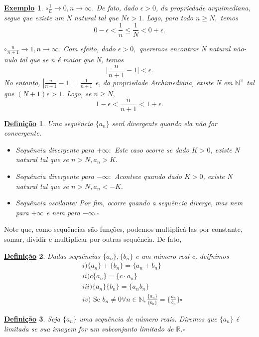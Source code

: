 \documentclass{article}
\newtheorem*{def*}{\underline{Defini\c c\~ao}}
\newtheorem{example}{\underline{Exemplo}}
\begin{document}
\begin{example}
  $\circ{}\frac{1}{n}\rightarrow0, n\rightarrow\infty$. De fato, dado $\epsilon > 0$, da propriedade arquimediana, segue que 
existe um N natural tal que $N\epsilon > 1.$ Logo, para todo $n\geq{N},$ temos 
  $$
  0 - \epsilon < \frac{1}{n}\leq{\frac{1}{N}} < 0 + \epsilon.
  $$

  $\circ \frac{n}{n+1}\rightarrow 1, n\rightarrow\infty$. Com efeito, dado $\epsilon > 0,$ queremos encontrar N natural n\~ao-nulo tal que
se n \'e maior que N, temos 
  $$
    \biggl|\frac{n}{n+1} - 1\biggr| < \epsilon.
  $$
  No entanto, $|\frac{n}{n+1}-1| = \frac{1}{n+1}$ e, da propriedade Archimediana, existe N em $\mathbb{N}^{\times}$ tal que
  $(N+1)\epsilon > 1$. Logo, se $n\geq{N},$
  $$
    1 - \epsilon < \frac{n}{n+1} < 1 + \epsilon.
  $$
\end{example}
\begin{def*}
  Uma sequ\^encia $\{a_{n}\}$ ser\'a divergente quando ela n\~ao for convergente.
 \begin{itemize}
    \item[I)] Sequ\^encia divergente para $+\infty:$ Este caso ocorre se dado $K > 0$, existe N natural tal que se $n > N,
a_{n} > K.$
    \item[II)] Sequ\^encia divergente para $-\infty:$ Acontece quando dado $K > 0$, existe N natural tal que se $n > N, 
a_{n} < -K.$
    \item[III)]Sequ\^encia oscilante: Por fim, ocorre quando a sequ\^encia diverge, mas nem para $+\infty$ e nem para $-\infty.\square$
 \end{itemize}
\end{def*}
  Note que, como sequ\^encias s\~ao fun\c c\~oes, podemos multiplic\'a-las por constante, somar, dividir e multiplicar por outras sequ\^encia. De fato,
 \begin{def*}
   Dadas sequ\^encias $\{a_{n}\}, \{b_{n}\}$ e um n\'umero real c, deifnimos 
  \begin{align*}
    &i) \{a_{n}\} + \{b_{n}\} = \{a_{n} + b_{n}\}\\
    &ii) c\{a_{n}\} = \{c \cdot a_{n}\}\\
    &iii) \{a_{n}\}\{b_{n}\} = \{a_{n}b_{n}\}\\
    &iv) \text{ Se }b_{n}\neq0\forall n\in \mathbb{N}, \frac{\{a_{n}\}}{\{b_{n}\}} = \biggl\{\frac{a_{n}}{b_{n}}\biggr\}\square
  \end{align*}
 \end{def*}
\begin{def*}
  Seja $\{a_{n}\}$ uma sequ\^encia de n\'umero reais. Diremos que $\{a_{n}\}$ \'e limitada se sua imagem for um subconjunto
limitado de $\mathbb{R}.\square$
\end{def*}
\end{document}
